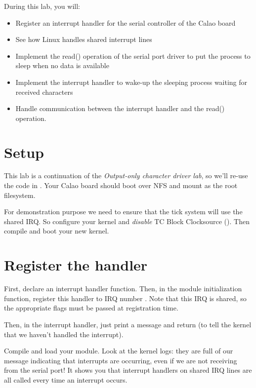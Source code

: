 
During this lab, you will:

\begin{itemize}
\item Register an interrupt handler for the serial controller of the
  Calao board
\item See how Linux handles shared interrupt lines
\item Implement the read() operation of the serial port driver to put
  the process to sleep when no data is available
\item Implement the interrupt handler to wake-up the sleeping process
  waiting for received characters
\item Handle communication between the interrupt handler and the
  read() operation.
\end{itemize}

\section{Setup}

This lab is a continuation of the {\em Output-only character driver
  lab}, so we'll re-use the code in
. Your Calao board should boot over
NFS and mount  as the root
filesystem.

For demonstration purpose we need to ensure that the tick system will
use the shared IRQ. So configure your kernel and {\em disable} TC
Block Clocksource (). Then compile
and boot your new kernel.

\section{Register the handler}

First, declare an interrupt handler function. Then, in the module
initialization function, register this handler to IRQ number
. Note that this IRQ is shared, so the appropriate flags
must be passed at registration time.

Then, in the interrupt handler, just print a message and
return  (to tell the kernel that we haven't handled
the interrupt).

Compile and load your module. Look at the kernel logs: they are full
of our message indicating that interrupts are occurring, even if we
are not receiving from the serial port! It shows you that interrupt
handlers on shared IRQ lines are all called every time an interrupt
occurs.

